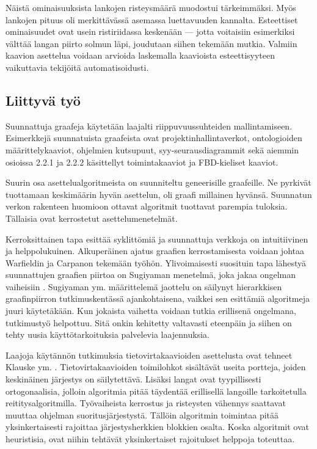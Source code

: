 \documentclass[finnish,12pt]{article}
\begin{document}
Näistä ominaisuuksista lankojen risteysmäärä muodostui tärkeimmäksi. Myös lankojen pituus oli merkittävässä asemassa luettavuuden kannalta.
Esteettiset ominaisuudet ovat usein ristiriidassa keskenään --- jotta voitaisiin esimerkiksi välttää langan piirto solmun läpi, joudutaan siihen tekemään mutkia.
Valmiin kaavion asettelua voidaan arvioida laskemalla kaavioista esteettisyyteen vaikuttavia tekijöitä automatisoidusti.


	\subsection{Liittyvä työ}

Suunnattuja graafeja käytetään laajalti riippuvuussuhteiden mallintamiseen.
Esimerkkejä suunnatuista graafeista ovat projektinhallintaverkot, ontologioiden määrittelykaaviot, ohjelmien kutsupuut, syy-seurausdiagrammit sekä aiemmin osioissa 2.2.1 ja 2.2.2 käsittellyt toimintakaaviot ja FBD-kieliset kaaviot.

Suurin osa asettelualgoritmeista on suunniteltu geneerisille graafeille.
Ne pyrkivät tuottamaan keskimäärin hyvän asettelun, oli graafi millainen hyvänsä.
Suunnatun verkon rakenteen huomioon ottavat algoritmit tuottavat parempia tuloksia.
Tällaisia ovat kerrostetut asettelumenetelmät.

Kerroksittainen tapa esittää syklittömiä ja suunnattuja verkkoja on intuitiivinen ja helppolukuinen.
Alkuperäinen ajatus graafien kerrostamisesta voidaan johtaa Warfieldin \cite{RefWorks:58} ja Carpanon \cite{RefWorks:57} tekemään työhön.
Ylivoimaisesti suosituin tapa lähestyä suunnattujen graafien piirtoa on Sugiyaman menetelmä, joka jakaa ongelman vaiheisiin \cite{RefWorks:9}.
Sugiyaman ym. määrittelemä jaottelu on säilynyt hierarkkisen graafinpiirron tutkimuskentässä ajankohtaisena, vaikkei sen esittämiä algoritmeja juuri käytetäkään.
Kun jokaista vaihetta voidaan tutkia erillisenä ongelmana, tutkimustyö helpottuu.
Sitä onkin kehitetty valtavasti eteenpäin ja siihen on tehty uusia käyttötarkoituksia palvelevia laajennuksia.

Laajoja käytännön tutkimuksia tietovirtakaavioiden asettelusta ovat tehneet Klauske ym. \cite{RefWorks:50}.
Tietovirtakaavioiden toimilohkot sisältävät useita portteja, joiden keskinäinen järjestys on säilytettävä.
Lisäksi langat ovat tyypillisesti ortogonaalisia, jolloin algoritmia pitää täydentää erillisellä langoille tarkoitetulla reititysalgoritmilla.
Työvaiheista kerrostus ja risteysten vähennys saattavat muuttaa ohjelman suoritusjärjestystä.
Tällöin algoritmin toimintaa pitää yksinkertaisesti rajoittaa järjestysherkkien blokkien osalta.
Koska algoritmit ovat heuristisia, ovat niihin tehtävät yksinkertaiset rajoitukset helppoja toteuttaa.
\end{document}
